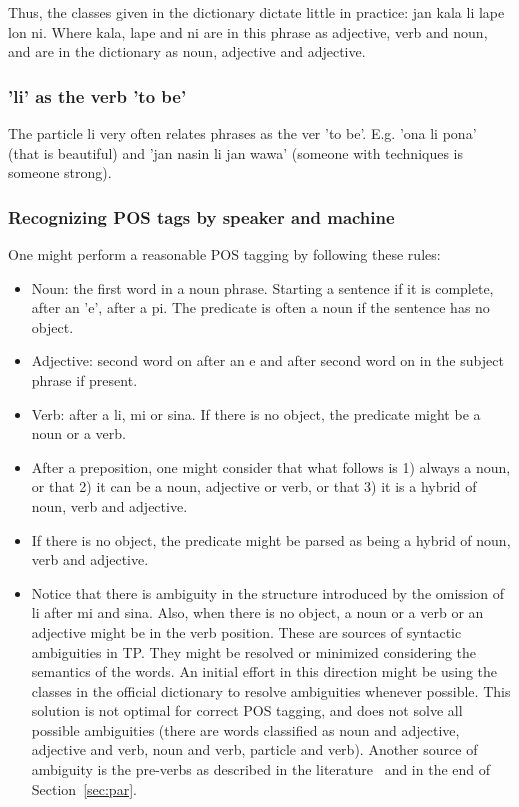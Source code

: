 Thus, the classes given in the dictionary dictate little
in practice:
jan kala li lape lon ni.
Where kala, lape and ni are in this phrase
as adjective, verb and noun,
and are in the dictionary as noun,
adjective and adjective.

\subsubsection{'li' as the verb 'to be'}
The particle li very often relates phrases as
the ver 'to be'. E.g. 'ona li pona' (that is beautiful)
and 'jan nasin li jan wawa' (someone with techniques is someone strong).

\subsubsection{Recognizing POS tags by speaker and machine}\label{sec:rec}
One might perform a reasonable POS tagging by following these rules:
\begin{itemize}
  \item Noun: the first word in a noun phrase.
    Starting a sentence if it is complete,
    after an 'e', after a pi.
    The predicate is often a noun
    if the sentence has no object.
  \item Adjective: second word on after an e and after
    second word on in the subject phrase if present.
  \item Verb: after a li, mi or sina.
    If there is no object, the predicate
    might be a noun or a verb.
  \item After a preposition, one might consider that what follows is 1) always
    a noun, or that 2) it can be a noun, adjective or verb,
    or that 3) it is a hybrid of noun, verb and adjective.~\cite{janKipo}
  \item If there is no object, the predicate might be parsed
as being a hybrid of noun, verb and adjective.
  \item Notice that there is ambiguity in the structure
    introduced by the omission of li after mi and sina.
    Also, when there is no object, a noun or a verb
    or an adjective might be in the verb position.
    These are sources of syntactic ambiguities
    in TP.
    They might be resolved or minimized considering the semantics
    of the words.
    An initial effort in this direction might be
    using the classes in the official dictionary to resolve
    ambiguities whenever possible.
    This solution is not optimal for correct POS tagging,
    and does not solve all possible ambiguities
    (there are words classified as noun and adjective,
    adjective and verb, noun and verb, particle and verb).
    Another source of ambiguity is the pre-verbs as described
    in the literature~\cite{tpLang,kama} and
    in the end of Section~\ref{sec:par}.
\end{itemize}


